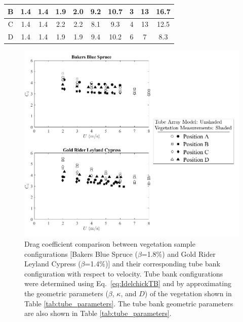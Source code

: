\documentclass[12pt]{article}
\begin{document}
\begin{table}[!]
\begin{tabular}{|c|c|c|c|c|c|c|c|c|c|}
    B                            & 1.4          & 1.4      & 1.9                  & 2.0               & 9.2               & 10.7        & 3                           & 13            &   16.7                 \\ \hline
    C                            & 1.4           & 1.4     & 2.2                  & 2.2                & 8.1               & 9.3       & 4                          & 13               &   12.5       \\ \hline
    D                            & 1.4            & 1.4      & 1.9                  & 1.9                & 9.4               & 10.2       & 6                          & 7              &   8.3             \\ \hline
    \end{tabular}
\end{table}

\begin{figure}[!]
	\centering
\includegraphics[width=\textwidth,keepaspectratio]{Picture13a.png}
	\caption[Drag coefficient comparison between vegetation samples and tube bank configurations]{Drag coefficient comparison between vegetation sample configurations [Bakers Blue Spruce ($\beta$=1.8\%) and Gold Rider Leyland Cypress ($\beta$=1.4\%)] and their corresponding tube bank configuration with respect to velocity. Tube bank configurations were determined using Eq.~\ref{eq:IdelchickTB} and by approximating the geometric parameters ($\beta$, $\kappa$, and $D$) of the vegetation shown in Table \ref{tab:tube_parameters}. The tube bank geometric parameters are also shown in  Table \ref{tab:tube_parameters}.}
	\label{fig:TBGR}
\end{figure}
\end{document}
